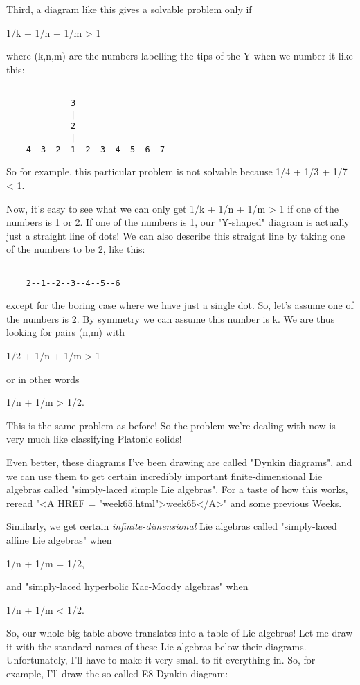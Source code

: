 Third, a diagram like this gives a solvable problem only if

1/k + 1/n + 1/m > 1

where (k,n,m) are the numbers labelling the tips of the Y when we
number it like this:


\begin{verbatim}

             3
             |
             2
             |
    4--3--2--1--2--3--4--5--6--7
\end{verbatim}
    
So for example, this particular problem is not solvable because
1/4 + 1/3 + 1/7 < 1.

Now, it's easy to see what we can only get 1/k + 1/n + 1/m > 1 if one 
of the numbers is 1 or 2.  If one of the numbers is 1, our "Y-shaped"
diagram is actually just a straight line of dots!  We can also
describe this straight line by taking one of the numbers to be 2, like
this:

\begin{verbatim}

    2--1--2--3--4--5--6
\end{verbatim}
    
except for the boring case where we have just a single dot.  So, 
let's assume one of the numbers is 2.  By symmetry we can assume
this number is k.  We are thus looking for pairs (n,m) with 

1/2 + 1/n + 1/m > 1

or in other words

1/n + 1/m > 1/2.

This is the same problem as before!  So the problem we're dealing
with now is very much like classifying Platonic solids!  

Even better, these diagrams I've been drawing are called "Dynkin
diagrams", and we can use them to get certain incredibly important
finite-dimensional Lie algebras called "simply-laced simple Lie algebras".  
For a taste of how this works, reread "<A HREF = "week65.html">week65</A>" and some previous Weeks.  

Similarly, we get certain \emph{infinite-dimensional} Lie algebras 
called "simply-laced affine Lie algebras" when 

1/n + 1/m = 1/2,

and "simply-laced hyperbolic Kac-Moody algebras" when 

1/n + 1/m < 1/2.

So, our whole big table above translates into a table of Lie algebras!
Let me draw it with the standard names of these Lie algebras below their
diagrams.  Unfortunately, I'll have to make it very small to fit
everything in.  So, for example, I'll draw the so-called E8 Dynkin
diagram:


